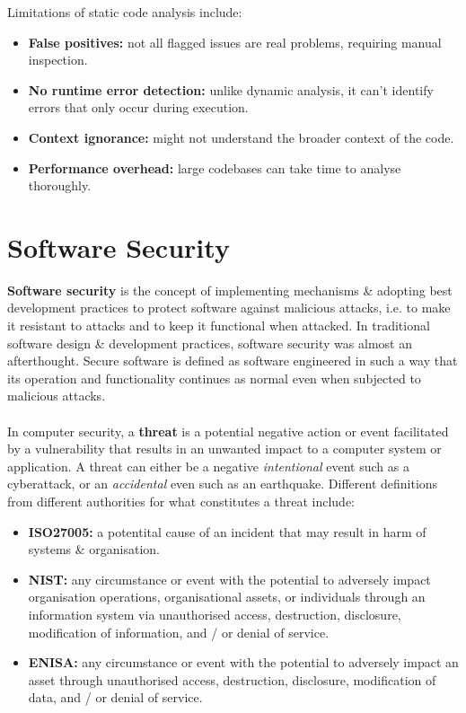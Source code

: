\documentclass[a4paper,11pt]{article}
\begin{document}
Limitations of static code analysis include:
\begin{itemize}
    \item   \textbf{False positives:} not all flagged issues are real problems, requiring manual inspection.
    \item   \textbf{No runtime error detection:} unlike dynamic analysis, it can't identify errors that only occur during execution.
    \item   \textbf{Context ignorance:} might not understand the broader context of the code.
    \item   \textbf{Performance overhead:} large codebases can take time to analyse thoroughly.
\end{itemize}

\section{Software Security}
\textbf{Software security} is the concept of implementing mechanisms \& adopting best development practices to protect software against malicious attacks, i.e. to make it resistant to attacks and to keep it functional when attacked.
In traditional software design \& development practices, software security was almost an afterthought.
Secure software is defined as software engineered in such a way that its operation and functionality continues as normal even when subjected to malicious attacks.
\\\\
In computer security, a \textbf{threat} is a potential negative action or event facilitated by a vulnerability that results in an unwanted impact to a computer system or application.
A threat can either be a negative \textit{intentional} event such as a cyberattack, or an \textit{accidental} even such as an earthquake.
Different definitions from different authorities for what constitutes a threat include:
\begin{itemize}
    \item   \textbf{ISO27005:} a potentital cause of an incident that may result in harm of systems \& organisation.
    \item   \textbf{NIST:} any circumstance or event with the potential to adversely impact organisation operations, organisational assets, or individuals through an information system via unauthorised access, destruction, disclosure, modification of information, and / or denial of service.
    \item   \textbf{ENISA:} any circumstance or event with the potential to adversely impact an asset through unauthorised access, destruction, disclosure, modification of data, and / or denial of service.
\end{itemize}
\end{document}
